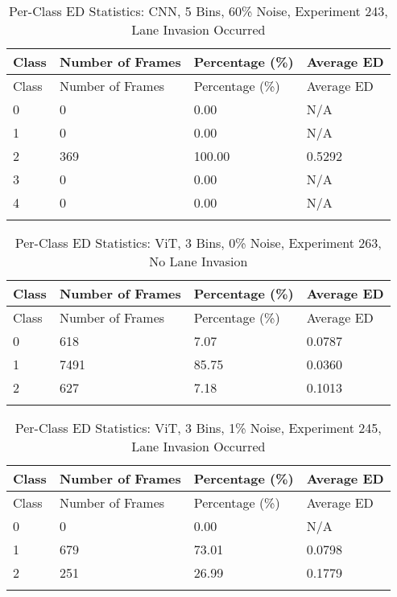 
\begin{longtable}{@{}llll@{}}
\toprule
Class & Number of Frames & Percentage (\%) & Average ED \\
\midrule
\endfirsthead
\toprule
Class & Number of Frames & Percentage (\%) & Average ED \\
\midrule
\endhead
0 & 0 & 0.00 & N/A \\
1 & 0 & 0.00 & N/A \\
2 & 369 & 100.00 & 0.5292 \\
3 & 0 & 0.00 & N/A \\
4 & 0 & 0.00 & N/A \\
\bottomrule
\caption{Per-Class ED Statistics: CNN, 5 Bins, 60\% Noise, Experiment 243, Lane Invasion Occurred}
\label{tab:exp243_CNN_5bins_60noise}
\end{longtable}
        


\begin{longtable}{@{}llll@{}}
\toprule
Class & Number of Frames & Percentage (\%) & Average ED \\
\midrule
\endfirsthead
\toprule
Class & Number of Frames & Percentage (\%) & Average ED \\
\midrule
\endhead
0 & 618 & 7.07 & 0.0787 \\
1 & 7491 & 85.75 & 0.0360 \\
2 & 627 & 7.18 & 0.1013 \\
\bottomrule
\caption{Per-Class ED Statistics: ViT, 3 Bins, 0\% Noise, Experiment 263, No Lane Invasion}
\label{tab:exp263_ViT_3bins_0noise}
\end{longtable}
        


\begin{longtable}{@{}llll@{}}
\toprule
Class & Number of Frames & Percentage (\%) & Average ED \\
\midrule
\endfirsthead
\toprule
Class & Number of Frames & Percentage (\%) & Average ED \\
\midrule
\endhead
0 & 0 & 0.00 & N/A \\
1 & 679 & 73.01 & 0.0798 \\
2 & 251 & 26.99 & 0.1779 \\
\bottomrule
\caption{Per-Class ED Statistics: ViT, 3 Bins, 1\% Noise, Experiment 245, Lane Invasion Occurred}
\label{tab:exp245_ViT_3bins_1noise}
\end{longtable}
        

